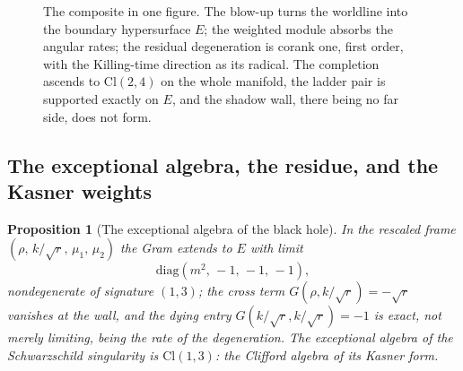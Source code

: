 \documentclass[11pt]{article}
\newtheorem{proposition}[theorem]{Proposition}
\theoremstyle{definition}
\newcommand{\Cl}{\mathrm{Cl}}
\newcommand{\R}{\mathbb{R}}
\newcommand{\shW}{\mathcal{W}}
\newcommand{\dtS}{dt_{\mathrm{S}}}
\begin{document}
\begin{figure}[t]
\centering
{}
\caption{The composite in one figure. The blow-up turns the worldline into the boundary hypersurface $E$; the weighted module absorbs the angular rates; the residual degeneration is corank one, first order, with the Killing-time direction as its radical. The completion ascends to $\Cl(2,4)$ on the whole manifold, the ladder pair is supported exactly on $E$, and the shadow wall, there being no far side, does not form.}
\label{fig:composite}
\end{figure}

\subsection{The exceptional algebra, the residue, and the Kasner weights}\label{subsec:schwexceptional}

\begin{proposition}[The exceptional algebra of the black hole]\label{prop:schwexceptional}
In the rescaled frame $(\rho,\, k/\sqrt{r},\, \mu_1,\, \mu_2)$ the Gram extends to $E$ with limit
\[
\mathrm{diag}(m^2,\, -1,\, -1,\, -1),
\]
nondegenerate of signature $(1,3)$; the cross term $G(\rho, k/\sqrt{r}) = -\sqrt{r}$ vanishes at the wall, and the dying entry $G(k/\sqrt r, k/\sqrt r) = -1$ is \emph{exact}, not merely limiting, being the rate of the degeneration. The exceptional algebra of the Schwarzschild singularity is $\Cl(1,3)$: the Clifford algebra of its Kasner form.
\end{proposition}
\end{document}
